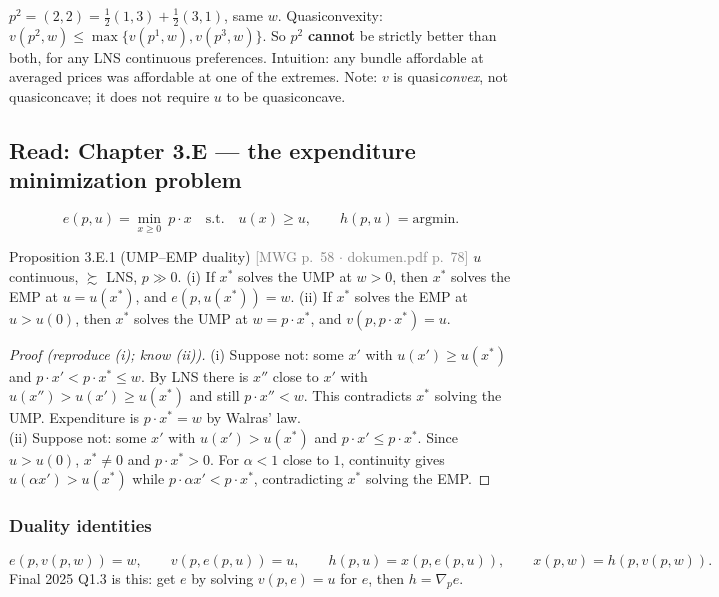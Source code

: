 \documentclass[11pt]{article}
\newcommand{\pref}{\succsim}
\newcommand{\mwg}[2]{\hfill{\small\textcolor{gray}{[MWG p.~#1 $\cdot$ dokumen.pdf p.~#2]}}}
\begin{document}
\begin{exam}
$p^2=(2,2)=\tfrac12(1,3)+\tfrac12(3,1)$, same $w$. Quasiconvexity: $v(p^2,w)\le\max\{v(p^1,w),v(p^3,w)\}$. So $p^2$ \textbf{cannot} be strictly better than both, for any LNS continuous preferences. Intuition: any bundle affordable at averaged prices was affordable at one of the extremes.
Note: $v$ is quasi\emph{convex}, not quasiconcave; it does not require $u$ to be quasiconcave.
\end{exam}

\subsection{Read: Chapter 3.E --- the expenditure minimization problem}
\[
e(p,u)=\min_{x\ge0}\ p\cdot x\quad\text{s.t.}\quad u(x)\ge u,\qquad h(p,u)=\text{argmin}.
\]

\begin{prop}{Proposition 3.E.1 (UMP--EMP duality) \mwg{58}{78}}
$u$ continuous, $\pref$ LNS, $p\gg0$.
(i) If $x^*$ solves the UMP at $w>0$, then $x^*$ solves the EMP at $u=u(x^*)$, and $e(p,u(x^*))=w$.
(ii) If $x^*$ solves the EMP at $u>u(0)$, then $x^*$ solves the UMP at $w=p\cdot x^*$, and $v(p,p\cdot x^*)=u$.
\end{prop}
\begin{proof}[Proof (reproduce (i); know (ii))]
(i) Suppose not: some $x'$ with $u(x')\ge u(x^*)$ and $p\cdot x'<p\cdot x^*\le w$. By LNS there is $x''$ close to $x'$ with $u(x'')>u(x')\ge u(x^*)$ and still $p\cdot x''<w$. This contradicts $x^*$ solving the UMP. Expenditure is $p\cdot x^*=w$ by Walras' law.\\
(ii) Suppose not: some $x'$ with $u(x')>u(x^*)$ and $p\cdot x'\le p\cdot x^*$. Since $u>u(0)$, $x^*\ne0$ and $p\cdot x^*>0$. For $\alpha<1$ close to $1$, continuity gives $u(\alpha x')>u(x^*)$ while $p\cdot\alpha x'<p\cdot x^*$, contradicting $x^*$ solving the EMP.
\end{proof}

\subsubsection{Duality identities}\label{sec:duality}
\[
e(p,v(p,w))=w,\qquad v(p,e(p,u))=u,\qquad h(p,u)=x(p,e(p,u)),\qquad x(p,w)=h(p,v(p,w)).
\]
Final 2025 Q1.3 is this: get $e$ by solving $v(p,e)=u$ for $e$, then $h=\nabla_pe$.
\end{document}
